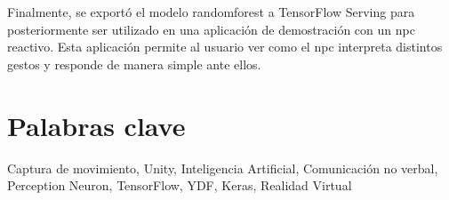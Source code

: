 Finalmente, se exportó el modelo \gls{randomforest} a TensorFlow Serving para posteriormente ser utilizado en una aplicación de demostración con un \gls{npc} reactivo. Esta aplicación permite al usuario ver como el \gls{npc} interpreta distintos gestos y responde de manera simple ante ellos.

\section*{Palabras clave}

\noindent Captura de movimiento, Unity, Inteligencia Artificial, Comunicación no verbal, Perception Neuron, TensorFlow, YDF, Keras, Realidad Virtual




